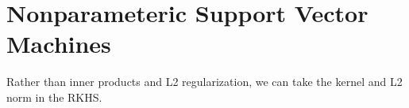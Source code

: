 \section{Nonparameteric Support Vector Machines} 

  Rather than inner products and L2 regularization, we can take the kernel and L2 norm in the RKHS.  
